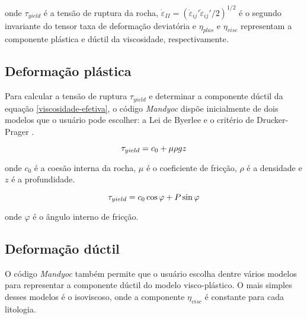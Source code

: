 \noindent onde $\tau_{yield}$ é a tensão de ruptura da rocha, $\dot{\varepsilon}_{II}=(\dot{\varepsilon}_{ij}' \dot{\varepsilon}_{ij}'/2)^{1/2}$ é o segundo invariante do tensor taxa de deformação deviatória e $\eta_{plas}$ e $\eta_{visc}$ representam a componente plástica e dúctil da viscosidade, respectivamente.

\subsection{Deformação plástica}

Para calcular a tensão de ruptura $\tau_{yield}$ e determinar a componente dúctil da equação \ref{viscosidade-efetiva}, o código \textit{Mandyoc} dispõe inicialmente de dois modelos que o usuário pode escolher: a Lei de Byerlee \citep[equação \ref{byerlee-law}]{byerlee1968} e o critério de Drucker-Prager \citep[equação \ref{drucker-prager}]{drucker-prager1952}.

\begin{equation}{\label{byerlee-law}}
    \tau_{yield} = c_0 + \mu \rho g z
\end{equation}

\noindent onde $c_0$ é a coesão interna da rocha, $\mu$ é o coeficiente de fricção, $\rho$ é a densidade e $z$ é a profundidade.

\begin{equation}{\label{drucker-prager}}
    \tau_{yield} = c_0 \cos{\varphi} + P \sin{\varphi}
\end{equation}

\noindent onde $\varphi$ é o ângulo interno de fricção.

\subsection{Deformação dúctil}

O código \textit{Mandyoc} também permite que o usuário escolha dentre vários modelos para representar a componente dúctil do modelo visco-plástico. O mais simples desses modelos é o isoviscoso, onde a componente $\eta_{visc}$ é constante para cada litologia.


